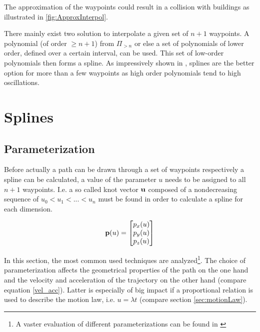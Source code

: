 The approximation of the waypoints could result in a collision with buildings as illustrated in \ref{fig:ApproxInterpol}.


There mainly exist two solution to interpolate a given set of $n+1$ waypoints. A polynomial (of order $\ge n+1$) from $\varPi_{>n}$ or else a set of polynomials of lower order, defined over a certain interval, can be used. This set of low-order polynomials then forms a spline. As impressively shown in \cite{dahmen}, splines are the better option for more than a few waypoints as high order polynomials tend to high oscillations.



\section{Splines}
\label{sec:splines}
\subsection{Parameterization}
\label{subsec:parameterization}
Before actually a path can be drawn through a set of waypoints respectively a spline can be calculated, a value of the parameter $u$ needs to be assigned to all $n+1$ waypoints. I.e. a so called knot vector ${\bf u}$ composed of a nondecreasing sequence of $u_0 < u_1 < ...< u_n$ must be found in order to calculate a spline for each dimension.

\begin{equation}
{\bf p}(u) =  \begin{bmatrix} p_x(u) \\ p_y(u) \\p_z(u) \end{bmatrix}
\end{equation}


In this section, the most common used techniques are analyzed\footnote{A vaster evaluation of different parameterizations can be found in \cite{haron}}. The choice of parameterization affects the geometrical properties of the path on the one hand and the velocity and acceleration of the trajectory on the other hand (compare equation \eqref{vel_acc}). Latter is especially of big impact if a proportional relation is used to describe the motion law, i.e. $u=\lambda t$ (compare section \ref{sec:motionLaw}).

